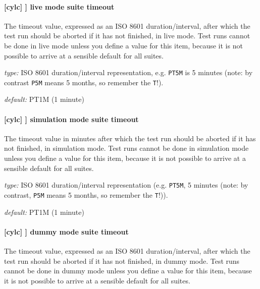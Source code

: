 \paragraph[live mode suite timeout]{[cylc] \textrightarrow [[reference test]] \textrightarrow live mode suite timeout}

The timeout value, expressed as an ISO 8601 duration/interval, after which the
test run should be aborted if it has not finished, in live mode. Test runs
cannot be done in live mode unless you define a value for this item, because
it is not possible to arrive at a sensible default for all suites.

\begin{myitemize}
    \item {\em type:} ISO 8601 duration/interval representation, e.g.
        \lstinline=PT5M= is 5 minutes (note: by contrast \lstinline=P5M= means 5
         months, so remember the \lstinline=T=!).
    \item {\em default:} PT1M (1 minute)
\end{myitemize}

\paragraph[simulation mode suite timeout]{[cylc] \textrightarrow [[reference test]] \textrightarrow simulation mode suite timeout}

The timeout value in minutes after which the test run should be aborted
if it has not finished, in simulation mode. Test runs cannot be done in
simulation mode unless you define a value for this item, because it is
not possible to arrive at a sensible default for all suites.

\begin{myitemize}
    \item {\em type:} ISO 8601 duration/interval representation (e.g.
 \lstinline=PT5M=, 5 minutes (note: by contrast, \lstinline=P5M= means 5
 months, so remember the \lstinline=T=!)).
    \item {\em default:} PT1M (1 minute)
\end{myitemize}

\paragraph[dummy mode suite timeout]{[cylc] \textrightarrow [[reference test]] \textrightarrow dummy mode suite timeout}

The timeout value, expressed as an ISO 8601 duration/interval, after which the
test run should be aborted if it has not finished, in dummy mode.  Test runs
cannot be done in dummy mode unless you define a value for this item, because
it is not possible to arrive at a sensible default for all suites.


